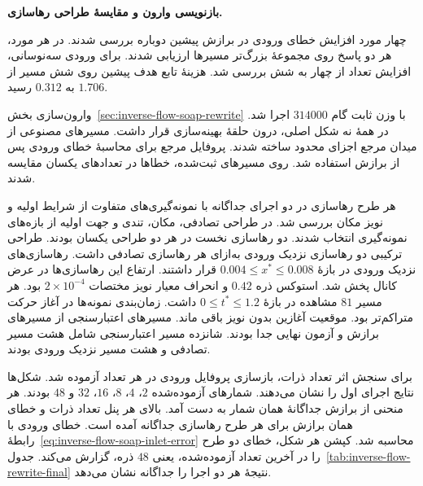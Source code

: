 \begin{FlowRevisionText}
\FloatBarrier
\noindent\textbf{بازنویسی وارون و مقایسهٔ طراحی رهاسازی.}\par\smallskip
چهار مورد افزایش خطای ورودی در برازش پیشین دوباره بررسی شدند.
در هر مورد، هر دو پاسخ روی مجموعهٔ بزرگ‌تر مسیرها ارزیابی شدند.
برای ورودی سه‌نوسانی، افزایش تعداد از چهار به شش بررسی شد.
هزینهٔ تابع هدف پیشین روی شش مسیر از $1.706$ به $0.312$ رسید.

وارون‌سازی بخش~\ref{sec:inverse-flow-soap-rewrite} با وزن ثابت گام $314000$ اجرا شد.
در همهٔ نه شکل اصلی،  درون حلقهٔ بهینه‌سازی قرار داشت.
مسیرهای مصنوعی از میدان مرجع اجزای محدود ساخته شدند.
پروفایل مرجع برای محاسبهٔ خطای ورودی پس از برازش استفاده شد.
روی مسیرهای ثبت‌شده، خطاها در تعدادهای یکسان مقایسه شدند.

هر طرح رهاسازی در دو اجرای جداگانه با نمونه‌گیری‌های متفاوت از شرایط اولیه و نویز مکان بررسی شد.
در طراحی تصادفی، مکان، تندی و جهت اولیه از بازه‌های نمونه‌گیری انتخاب شدند.
دو رهاسازی نخست در هر دو طراحی یکسان بودند.
طراحی ترکیبی دو رهاسازی نزدیک ورودی به‌ازای هر رهاسازی تصادفی داشت.
رهاسازی‌های نزدیک ورودی در بازهٔ $0.004\le x^*\le0.008$ قرار داشتند.
ارتفاع این رهاسازی‌ها در عرض کانال پخش شد.
استوکس ذره $0.42$ و انحراف معیار نویز مختصات $2\times10^{-4}$ بود.
هر مسیر $81$ مشاهده در بازهٔ $0\le t^*\le1.2$ داشت.
زمان‌بندی نمونه‌ها در آغاز حرکت متراکم‌تر بود.
موقعیت آغازین بدون نویز باقی ماند.
مسیرهای اعتبارسنجی از مسیرهای برازش و آزمون نهایی جدا بودند.
شانزده مسیر اعتبارسنجی شامل هشت مسیر تصادفی و هشت مسیر نزدیک ورودی بودند.

برای سنجش اثر تعداد ذرات، بازسازی پروفایل ورودی در هر تعداد آزموده شد. شکل‌ها نتایج اجرای اول را نشان می‌دهند.
شمارهای آزموده‌شده $2$، $4$، $8$، $16$، $32$ و $48$ بودند.
هر منحنی از برازش جداگانهٔ همان شمار به دست آمد.
بالای هر پنل تعداد ذرات و خطای همان برازش برای هر طرح رهاسازی جداگانه آمده است.
خطای ورودی با رابطهٔ~\eqref{eq:inverse-flow-soap-inlet-error} محاسبه شد.
کپشن هر شکل، خطای دو طرح را در آخرین تعداد آزموده‌شده، یعنی $48$ ذره، گزارش می‌کند. جدول~\ref{tab:inverse-flow-rewrite-final} نتیجهٔ هر دو اجرا را جداگانه نشان می‌دهد.


\end{FlowRevisionText}
